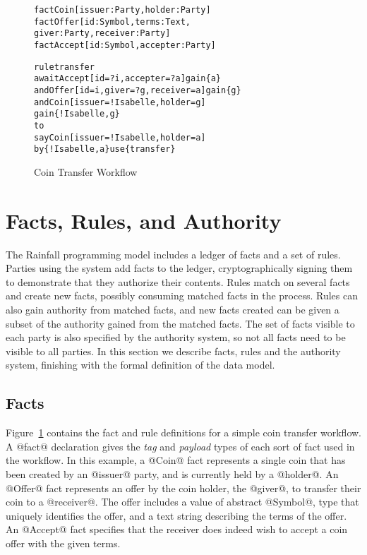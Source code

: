 
\clearpage{}


\begin{figure}
\begin{small}
\begin{alltt}
fact  Coin   [issuer: Party,  holder:   Party]
fact  Offer  [id:     Symbol, terms:    Text,
              giver:  Party,  receiver: Party ]
fact  Accept [id:     Symbol, accepter: Party]

rule  transfer
await Accept [id = ?i, accepter = ?a]            gain \{a\}
  and Offer  [id = i,  giver = ?g, receiver = a] gain \{g\}
  and Coin   [issuer = !Isabelle,  holder = g]
      gain \{!Isabelle,g\}
to
  say Coin   [issuer = !Isabelle,  holder = a]
   by \{!Isabelle, a\} use \{transfer\}
\end{alltt}
\end{small}
\caption{Coin Transfer Workflow}
\label{f:CoinTransfer}
\end{figure}


\section{Facts, Rules, and Authority}
\label{s:FactsWeights}
The Rainfall programming model includes a ledger of facts and a set of rules. Parties using the system add facts to the ledger, cryptographically signing them to demonstrate that they authorize their contents. Rules match on several facts and create new facts, possibly consuming matched facts in the process. Rules can also gain authority from matched facts, and new facts created can be given a subset of the authority gained from the matched facts. The set of facts visible to each party is also specified by the authority system, so not all facts need to be visible to all parties. In this section we describe facts, rules and the authority system, finishing with the formal definition of the data model.


\subsection{Facts}
\label{s:Facts}
Figure~\ref{f:CoinTransfer} contains the fact and rule definitions for a simple coin transfer workflow. A @fact@ declaration gives the \emph{tag} and \emph{payload} types of each sort of fact used in the workflow. In this example, a @Coin@ fact represents a single coin that has been created by an @issuer@ party, and is currently held by a @holder@. An @Offer@ fact represents an offer by the coin holder, the @giver@, to transfer their coin to a @receiver@. The offer includes a value of abstract @Symbol@, type that uniquely identifies the offer, and a text string describing the terms of the offer. An @Accept@ fact specifies that the receiver does indeed wish to accept a coin offer with the given terms.

